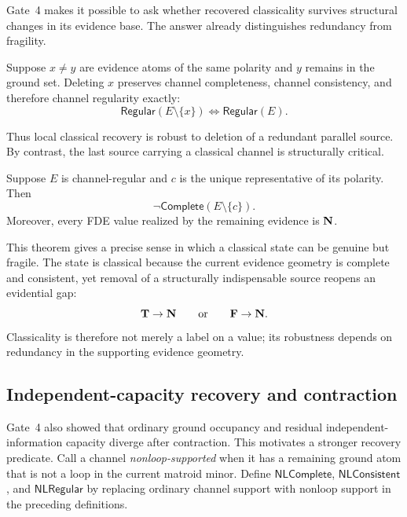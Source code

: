 Gate~4 makes it possible to ask whether recovered classicality survives structural
changes in its evidence base.  The answer already distinguishes redundancy from
fragility.

\begin{theorem}
\label{thm:parallel-deletion-preserves-regularity}
Suppose \(x\neq y\) are evidence atoms of the same polarity and \(y\) remains in the
ground set.  Deleting \(x\) preserves channel completeness, channel consistency, and
therefore channel regularity exactly:
\[
  \mathsf{Regular}(E\setminus\{x\})
  \Longleftrightarrow
  \mathsf{Regular}(E).
\]
\statusverified
\end{theorem}

Thus local classical recovery is robust to deletion of a redundant parallel source.
By contrast, the last source carrying a classical channel is structurally critical.

\begin{theorem}
\label{thm:unique-deletion-classical-to-gap}
Suppose \(E\) is channel-regular and \(c\) is the unique representative of its
polarity.  Then
\[
  \neg\mathsf{Complete}(E\setminus\{c\}).
\]
Moreover, every FDE value realized by the remaining evidence is \(\mathbf{N}\).
\statusverified
\end{theorem}

This theorem gives a precise sense in which a classical state can be genuine but
fragile.  The state is classical because the current evidence geometry is complete
and consistent, yet removal of a structurally indispensable source reopens an
evidential gap:
\[
  \mathbf{T}\to\mathbf{N}
  \qquad\text{or}\qquad
  \mathbf{F}\to\mathbf{N}.
\]
Classicality is therefore not merely a label on a value; its robustness depends on
redundancy in the supporting evidence geometry.

\subsection{Independent-capacity recovery and contraction}

Gate~4 also showed that ordinary ground occupancy and residual independent-information
capacity diverge after contraction.  This motivates a stronger recovery predicate.
Call a channel \emph{nonloop-supported} when it has a remaining ground atom that is
not a loop in the current matroid minor.  Define \(\mathsf{NLComplete}\),
\(\mathsf{NLConsistent}\), and \(\mathsf{NLRegular}\) by replacing ordinary channel
support with nonloop support in the preceding definitions.

